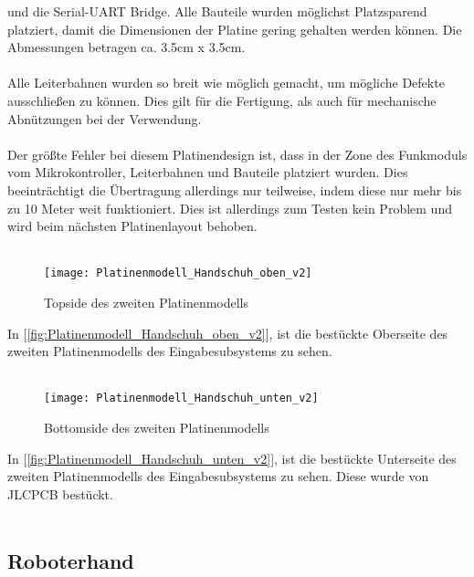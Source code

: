 \documentclass[titlepage,12pt,twoside]{article}
\begin{document}
und die Serial-UART Bridge. Alle Bauteile wurden möglichst Platzsparend platziert, damit die Dimensionen der Platine gering gehalten werden können.
Die Abmessungen betragen ca. 3.5cm x 3.5cm. \\
\\
Alle Leiterbahnen wurden so breit wie möglich gemacht, um mögliche Defekte ausschließen zu können. Dies gilt für die Fertigung, als auch für mechanische
Abnützungen bei der Verwendung. \\
\\
Der größte Fehler bei diesem Platinendesign ist, dass in der Zone des Funkmoduls vom Mikrokontroller, Leiterbahnen und Bauteile platziert wurden.
Dies beeinträchtigt die Übertragung allerdings nur teilweise, indem diese nur mehr bis zu 10 Meter weit funktioniert. Dies ist allerdings zum Testen
kein Problem und wird beim nächsten Platinenlayout behoben. \\
\\
\begin{figure}[H]
	\begin{center}
		\scalebox{0.6}
		{\texttt{[image: Platinenmodell\_Handschuh\_oben\_v2]}}
		\caption{Topside des zweiten Platinenmodells}
		\label{fig:Platinenmodell_Handschuh_oben_v2}		
	\end{center}
\end{figure}
\hfill \break
In [\textcolor{blue}{\autoref{fig:Platinenmodell_Handschuh_oben_v2}}], ist die bestückte Oberseite des zweiten Platinenmodells des Eingabesubsystems zu sehen. \\
\\
\begin{figure}[H]
	\begin{center}
		\scalebox{0.6}
		{\texttt{[image: Platinenmodell\_Handschuh\_unten\_v2]}}
		\caption{Bottomside des zweiten Platinenmodells}
		\label{fig:Platinenmodell_Handschuh_unten_v2}		
	\end{center}
\end{figure}
\hfill \break
In [\textcolor{blue}{\autoref{fig:Platinenmodell_Handschuh_unten_v2}}], ist die bestückte Unterseite des zweiten Platinenmodells des Eingabesubsystems zu sehen. Diese wurde von JLCPCB bestückt. \\
\\

\newpage
\subsection{Roboterhand}
\end{document}
